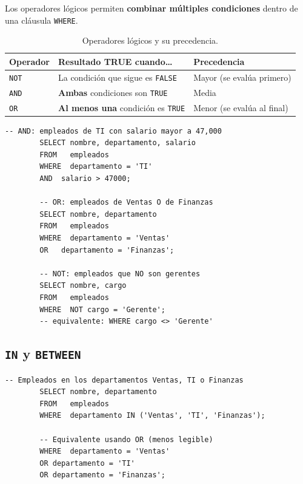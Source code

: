\documentclass[12pt, a4paper]{article}
\begin{document}
	Los operadores lógicos permiten \textbf{combinar múltiples
		condiciones} dentro de una cláusula \texttt{WHERE}.
	
	\begin{table}[H]
		\centering
		\small
		\renewcommand{\arraystretch}{1.5}
		\begin{tabularx}{\linewidth}{@{} l X X @{}}
			\toprule
			\textbf{Operador} & \textbf{Resultado TRUE cuando\ldots} & \textbf{Precedencia} \\
			\midrule
			\texttt{NOT} & La condición que sigue es \texttt{FALSE}
			& Mayor (se evalúa primero) \\
			\texttt{AND} & \textbf{Ambas} condiciones son \texttt{TRUE}
			& Media \\
			\texttt{OR}  & \textbf{Al menos una} condición es \texttt{TRUE}
			& Menor (se evalúa al final) \\
			\bottomrule
		\end{tabularx}
		\caption{Operadores lógicos y su precedencia.}
		\label{tab:operadores-logicos}
	\end{table}
	
	\begin{lstlisting}[caption={Uso de AND, OR y NOT.}]
		-- AND: empleados de TI con salario mayor a 47,000
		SELECT nombre, departamento, salario
		FROM   empleados
		WHERE  departamento = 'TI'
		AND  salario > 47000;
		
		-- OR: empleados de Ventas O de Finanzas
		SELECT nombre, departamento
		FROM   empleados
		WHERE  departamento = 'Ventas'
		OR   departamento = 'Finanzas';
		
		-- NOT: empleados que NO son gerentes
		SELECT nombre, cargo
		FROM   empleados
		WHERE  NOT cargo = 'Gerente';
		-- equivalente: WHERE cargo <> 'Gerente'
	\end{lstlisting}
	
	\subsection{\texttt{IN} y \texttt{BETWEEN}}
	
	\begin{lstlisting}[caption={IN para búsquedas en conjuntos.}]
		-- Empleados en los departamentos Ventas, TI o Finanzas
		SELECT nombre, departamento
		FROM   empleados
		WHERE  departamento IN ('Ventas', 'TI', 'Finanzas');
		
		-- Equivalente usando OR (menos legible)
		WHERE  departamento = 'Ventas'
		OR departamento = 'TI'
		OR departamento = 'Finanzas';
	\end{lstlisting}
	
\end{document}
